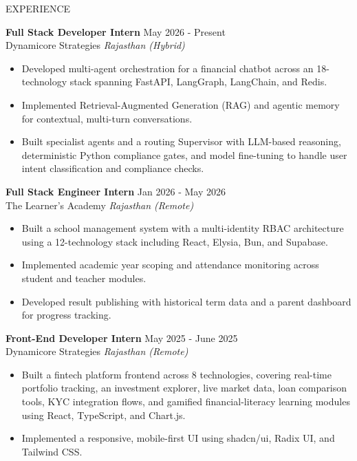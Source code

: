 \documentclass{resume} %
\begin{document}
\begin{rSection}{EXPERIENCE}

\textbf{Full Stack Developer Intern} \hfill May 2026 - Present\\
Dynamicore Strategies \hfill \textit{Rajasthan (Hybrid)}
 \begin{itemize}
    \itemsep -2pt {}
     \item Developed multi-agent orchestration for a financial chatbot across an 18-technology stack spanning FastAPI, LangGraph, LangChain, and Redis.
     \item Implemented Retrieval-Augmented Generation (RAG) and agentic memory for contextual, multi-turn conversations.
     \item Built specialist agents and a routing Supervisor with LLM-based reasoning, deterministic Python compliance gates, and model fine-tuning to handle user intent classification and compliance checks.
 \end{itemize}

\textbf{Full Stack Engineer Intern} \hfill Jan 2026 - May 2026\\
The Learner's Academy \hfill \textit{Rajasthan (Remote)}
 \begin{itemize}
    \itemsep -2pt {}
     \item Built a school management system with a multi-identity RBAC architecture using a 12-technology stack including React, Elysia, Bun, and Supabase.
     \item Implemented academic year scoping and attendance monitoring across student and teacher modules.
     \item Developed result publishing with historical term data and a parent dashboard for progress tracking.
 \end{itemize}

\textbf{Front-End Developer Intern} \hfill May 2025 - June 2025\\
Dynamicore Strategies \hfill \textit{Rajasthan (Remote)}
 \begin{itemize}
    \itemsep -2pt {}
     \item Built a fintech platform frontend across 8 technologies, covering real-time portfolio tracking, an investment explorer, live market data, loan comparison tools, KYC integration flows, and gamified financial-literacy learning modules using React, TypeScript, and Chart.js.
     \item Implemented a responsive, mobile-first UI using shadcn/ui, Radix UI, and Tailwind CSS.
 \end{itemize}


\end{rSection}
\end{document}

